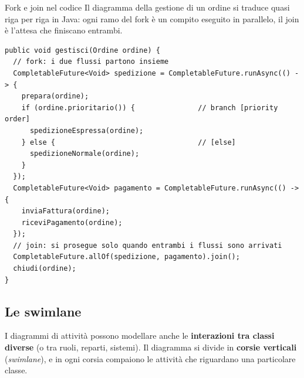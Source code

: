 \begin{esempio}{Fork e join nel codice}
Il diagramma della gestione di un ordine si traduce quasi riga per riga in Java: ogni ramo del fork è un compito
eseguito in parallelo, il join è l'attesa che finiscano entrambi.
\begin{lstlisting}[style=java, name=GestioneOrdini.java]
public void gestisci(Ordine ordine) {
  // fork: i due flussi partono insieme
  CompletableFuture<Void> spedizione = CompletableFuture.runAsync(() -> {
    prepara(ordine);
    if (ordine.prioritario()) {               // branch [priority order]
      spedizioneEspressa(ordine);
    } else {                                  // [else]
      spedizioneNormale(ordine);
    }
  });
  CompletableFuture<Void> pagamento = CompletableFuture.runAsync(() -> {
    inviaFattura(ordine);
    riceviPagamento(ordine);
  });
  // join: si prosegue solo quando entrambi i flussi sono arrivati
  CompletableFuture.allOf(spedizione, pagamento).join();
  chiudi(ordine);
}
\end{lstlisting}
\end{esempio}

\subsection{Le swimlane}

I diagrammi di attività possono modellare anche le \textbf{interazioni tra classi diverse} (o tra ruoli, reparti, sistemi).
Il diagramma si divide in \textbf{corsie verticali} (\textit{swimlane}), e in ogni corsia compaiono le attività che riguardano una
particolare classe.

